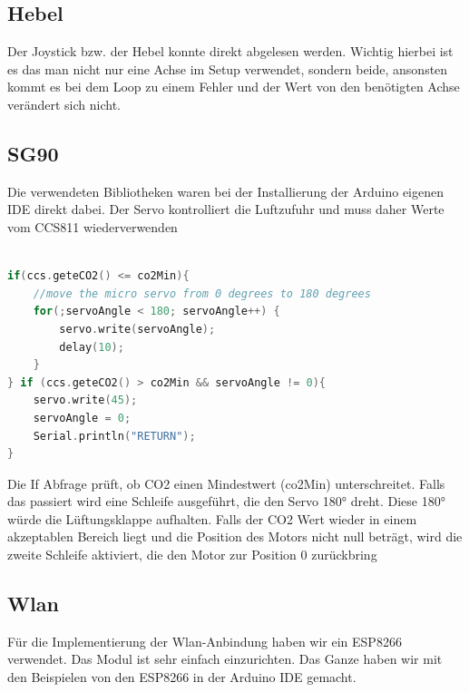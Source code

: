 \subsection{Hebel}

Der Joystick bzw.  der Hebel konnte direkt abgelesen werden. Wichtig hierbei ist es das man nicht nur eine Achse im Setup verwendet, sondern beide, ansonsten kommt es bei dem Loop zu einem Fehler und der Wert von den benötigten Achse verändert sich nicht.


\subsection{SG90}

Die verwendeten Bibliotheken waren bei der Installierung der Arduino eigenen IDE direkt dabei. Der Servo kontrolliert die Luftzufuhr und muss daher Werte vom CCS811 wiederverwenden

\begin{lstlisting}[language=C, caption=Automatisierten Servobewegung bei zu niedrigen CO2 Werten, label=code:SG90]

if(ccs.geteCO2() <= co2Min){
	//move the micro servo from 0 degrees to 180 degrees
	for(;servoAngle < 180; servoAngle++) {       
		servo.write(servoAngle);              
		delay(10);
	} 
} if (ccs.geteCO2() > co2Min && servoAngle != 0){
	servo.write(45); 
	servoAngle = 0;
	Serial.println("RETURN");
}
\end{lstlisting}
\cite{SG90tut}

Die If Abfrage prüft, ob CO2 einen Mindestwert (co2Min) unterschreitet. Falls das passiert wird eine Schleife ausgeführt, die den Servo 180° dreht. Diese 180° würde die Lüftungsklappe aufhalten. Falls der CO2 Wert wieder in einem akzeptablen Bereich liegt und die Position des Motors nicht null beträgt, wird die zweite Schleife aktiviert, die den Motor zur Position 0 zurückbring

\newpage
\def \currentAuthor {Florian Tipotsch}
\newpage
\subsection{Wlan}                                               Für die Implementierung der Wlan-Anbindung haben wir ein ESP8266 verwendet. Das Modul ist sehr einfach einzurichten. Das Ganze haben wir mit den Beispielen von den ESP8266 in der Arduino IDE gemacht.


